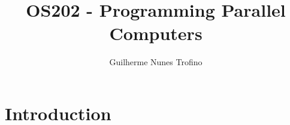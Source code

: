 \documentclass{article}
\title{OS202 - Programming Parallel Computers}
\author{Guilherme Nunes Trofino}
\begin{document}
\maketitle
\setlength{\parindent}{0pt}

\newpage\tableofcontents

\section{Introduction}
% 
% 

% 













\end{document}

